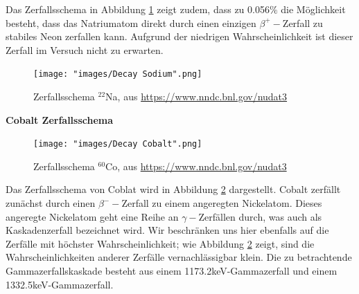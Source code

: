 \documentclass[%
aps,
onecolumn,
11pt,
tightenlines,
nofootinbib,
superscriptaddress,
floatfix,
prd,
]{revtex4-2}
\begin{document}
Das Zerfallsschema in Abbildung \ref{fig:decaysodium} zeigt zudem, dass zu 0.056$\%$ die Möglichkeit besteht, dass das Natriumatom direkt durch einen einzigen $\beta^+ -$Zerfall zu stabiles Neon zerfallen kann. Aufgrund der niedrigen Wahrscheinlichkeit ist dieser Zerfall im Versuch nicht zu erwarten.
\begin{figure}[ht]
	\texttt{[image: "images/Decay Sodium".png]}
	\caption{Zerfallsschema $^{22}$Na, aus \url{https://www.nndc.bnl.gov/nudat3}\cite{BASUNIA201569}}
	\label{fig:decaysodium}
\end{figure}

\noindent \textbf{Cobalt Zerfallsschema}\\
\begin{figure}[ht]
	\texttt{[image: "images/Decay Cobalt".png]}
	\caption{Zerfallsschema $^{60}$Co, aus \url{https://www.nndc.bnl.gov/nudat3}\cite{BROWNE20131849}}
	\label{fig:decaycobalt}
\end{figure}
Das Zerfallsschema von Coblat wird in Abbildung \ref{fig:decaycobalt} dargestellt. Cobalt zerfällt zunächst durch einen $\beta^- -$Zerfall zu einem angeregten Nickelatom. Dieses angeregte Nickelatom geht eine Reihe an $\gamma -$Zerfällen durch, was auch als Kaskadenzerfall bezeichnet wird. Wir beschränken uns hier ebenfalls auf die Zerfälle mit höchster Wahrscheinlichkeit; wie Abbildung \ref{fig:decaycobalt} zeigt, sind die Wahrscheinlichkeiten anderer Zerfälle vernachlässigbar klein. Die zu betrachtende Gammazerfallskaskade besteht aus einem 1173.2keV-Gammazerfall und einem 1332.5keV-Gammazerfall. 
\end{document}
